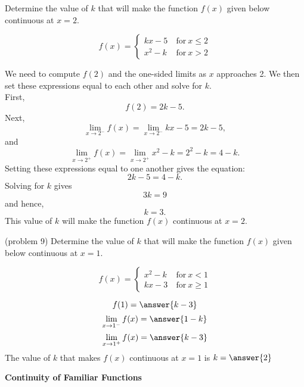 \documentclass{ximera}
\begin{document}
\begin{example}[example 9]
Determine the value of $k$ that will make the function $f(x)$ given below 
continuous at $x = 2$.
 
\[f(x) = \left\{
     \begin{array}{lr}
       kx-5 & \ \text{for} \  x \leq 2 \\
			 x^2 - k & \ \text{for} \ x > 2
     \end{array}
   \right.
\]

We need to  compute $f(2)$ and the one-sided limits as $x$ approaches 2.
We then set these expressions equal to each other and solve for $k$.\\
First,
\[
f(2) = 2k-5.
\]
Next,
\[
\lim_{x \to 2^-} f(x) = \lim_{x \to 2^-} kx-5 = 2k-5,
\]
and
\[
\lim_{x \to 2^+} f(x) = \lim_{x \to 2^+} x^2 - k = 2^2 - k = 4 - k.
\]
Setting these expressions equal to one another gives the equation:
\[2k - 5 = 4 - k.\]
Solving for $k$ gives
\[3k = 9\]
and hence,
\[k = 3.\]
This value of $k$ will make the function $f(x)$ continuous at $x=2$.
\end{example}

\begin{problem}(problem 9)
Determine the value of $k$ that will make the function $f(x)$ given below 
continuous at $x = 1$.
 
\[f(x) = \left\{
     \begin{array}{lr}
        x^2 - k & \ \text{for} \  x < 1 \\
			 kx-3 & \ \text{for} \ x \geq 1
     \end{array}
   \right.
\]

\[
f(1) = \answer{k-3}
\]
\[
\lim_{x \to 1^-} f(x) = \answer{1-k}
\]
\[
\lim_{x \to 1^+} f(x) = \answer{k-3}
\]
The value of $k$ that makes $f(x)$ continuous at $x = 1$ is
$k = \answer{2}$
\end{problem}


\begin{center}
\textbf{Continuity of Familiar Functions}
\end{center}
\end{document}
